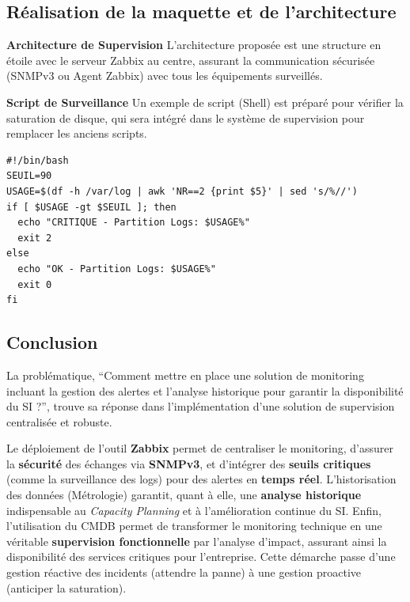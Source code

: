 \subsection*{Réalisation de la maquette et de l'architecture}
{}

\noindent \textbf{Architecture de Supervision}
L'architecture proposée est une structure en étoile avec le serveur Zabbix au centre, assurant la communication sécurisée (SNMPv3 ou Agent Zabbix) avec tous les équipements surveillés.

\vspace{0.5em}
\noindent \textbf{Script de Surveillance}
Un exemple de script (Shell) est préparé pour vérifier la saturation de disque, qui sera intégré dans le système de supervision pour remplacer les anciens scripts.
\begin{verbatim}
#!/bin/bash
SEUIL=90 
USAGE=$(df -h /var/log | awk 'NR==2 {print $5}' | sed 's/%//')
if [ $USAGE -gt $SEUIL ]; then
  echo "CRITIQUE - Partition Logs: $USAGE%" 
  exit 2 
else
  echo "OK - Partition Logs: $USAGE%"
  exit 0
fi
\end{verbatim}

\newpage

\subsection*{Conclusion}
{}
\noindent La problématique, ``Comment mettre en place une solution de monitoring incluant la gestion des alertes et l'analyse historique pour garantir la disponibilité du SI ?'', trouve sa réponse dans l'implémentation d'une solution de supervision centralisée et robuste.
\vspace{0.5em}

\noindent Le déploiement de l'outil \textbf{Zabbix} permet de centraliser le monitoring, d'assurer la \textbf{sécurité} des échanges via \textbf{SNMPv3}, et d'intégrer des \textbf{seuils critiques} (comme la surveillance des logs) pour des alertes en \textbf{temps réel}. L'historisation des données (Métrologie) garantit, quant à elle, une \textbf{analyse historique} indispensable au \textit{Capacity Planning} et à l'amélioration continue du SI. Enfin, l'utilisation du CMDB permet de transformer le monitoring technique en une véritable \textbf{supervision fonctionnelle} par l'analyse d'impact, assurant ainsi la disponibilité des services critiques pour l'entreprise. Cette démarche passe d'une gestion réactive des incidents (attendre la panne) à une gestion proactive (anticiper la saturation).


